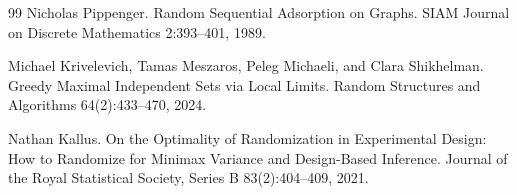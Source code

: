 \documentclass{article}
\begin{document}
\begin{thebibliography}{99}
   Nicholas Pippenger. Random Sequential Adsorption on Graphs. SIAM Journal on Discrete Mathematics 2:393--401, 1989.

   Michael Krivelevich, Tamas Meszaros, Peleg Michaeli, and Clara Shikhelman. Greedy Maximal Independent Sets via Local Limits. Random Structures and Algorithms 64(2):433--470, 2024.

   Nathan Kallus. On the Optimality of Randomization in Experimental Design: How to Randomize for Minimax Variance and Design-Based Inference. Journal of the Royal Statistical Society, Series B 83(2):404--409, 2021.

\end{thebibliography}
\end{document}
